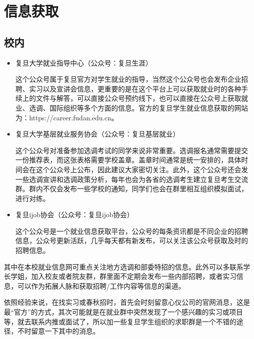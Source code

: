 
\section{信息获取}
\subsection{校内}

\begin{itemize}
    \item 复旦大学就业指导中心（公众号：复旦生涯）
    
    这个公众号属于复旦官方对学生就业的指导，当然这个公众号也会发布企业招聘、实习以及宣讲会信息，更重要的是在这个平台上可以获取就业时的各种手续上的文件与解答，可以直接公众号预约线下，也可以直接在公众号上获取就业、选调、国际组织等多个方面的信息。官方的复旦学生就业信息获取的网站为：https://career.fudan.edu.cn。
    
    \item 复旦大学基层就业服务协会（公众号：复旦基层就业）

    这个公众号对准备参加选调考试的同学来说非常重要。选调报名通常需要提交一份推荐表，而这张表格需要学校盖章。盖章时间通常是统一安排的，具体时间会在这个公众号上公布，因此建议大家密切关注。此外，这个公众号还会发一些选调宣讲和选调政策分析，每年也会为各省的选调考生建立复旦考生交流群。群内不仅会发布一些学校的通知，同学们也会在群里相互组织模拟面试，进行对练。


    \item 复旦ijob协会（公众号：复旦ijob协会）

    这个公众号是一个就业信息获取平台，公众号的每条资讯都是不同企业的招聘信息，公众号更新活跃，几乎每天都有新发布，可以关注该公众号获取及时的招聘信息。    

\end{itemize}

其中在本校就业信息网可重点关注地方选调和部委特招的信息。此外可以多联系学长学姐，加入校友或者院友群，群里面不定期会发布一些内部招聘，或者实习信息，可以作为拓展人脉和获取招聘/工作内容等信息的渠道。

依照经验来说，在找实习或春秋招时，首先会时刻留意心仪公司的官网消息，这是最“官方”的方式，其次可能就是在就业群中突然发现了一个感兴趣的实习或项目等，就去联系内推或面试了，所以加一些复旦学生组织的求职群是一个不错的途径，不时留意一下其中的消息。

